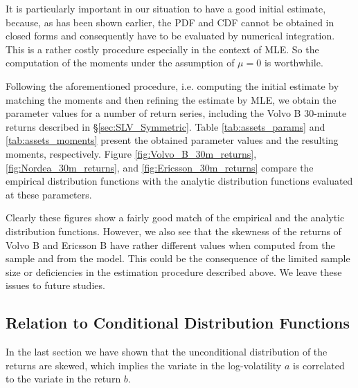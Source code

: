 It is particularly important in our situation to have a good initial
estimate, because, as has been shown earlier, the PDF and CDF cannot
be obtained in closed forms and consequently have to be evaluated by
numerical integration. This is a rather costly procedure especially in
the context of MLE. So the computation of the moments under the
assumption of $\mu = 0$ is worthwhile.

Following the aforementioned procedure, i.e. computing the initial
estimate by matching the moments and then refining the estimate by
MLE, we obtain the parameter values for a number of return series,
including the Volvo B 30-minute returns described in
\S\ref{sec:SLV_Symmetric}. Table \ref{tab:assets_params} and
\ref{tab:assets_moments} present the obtained parameter values and the
resulting moments, respectively. Figure \ref{fig:Volvo_B_30m_returns},
\ref{fig:Nordea_30m_returns}, and \ref{fig:Ericsson_30m_returns}
compare the empirical distribution functions with the analytic
distribution functions evaluated at these parameters.

Clearly these figures show a fairly good match of the empirical and
the analytic distribution functions. However, we also see that the
skewness of the returns of Volvo B and Ericsson B have rather
different values when computed from the sample and from the
model. This could be the consequence of the limited sample size or
deficiencies in the estimation procedure described above. We leave
these issues to future studies.


\subsection{Relation to Conditional Distribution Functions}
In the last section we have shown that the unconditional distribution of
the returns are skewed, which implies the variate in the
log-volatility $a$ is correlated to the variate in the return
$b$.

